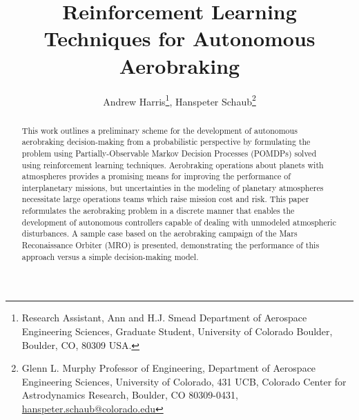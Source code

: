 \documentclass[paper,11pt]{AAS}		%
\begin{document}
\title{Reinforcement Learning Techniques for Autonomous Aerobraking}

\author{Andrew Harris\thanks{Research Assistant, Ann and H.J. Smead Department of Aerospace Engineering Sciences, Graduate 
Student, University of Colorado Boulder, Boulder,
		CO, 80309 USA.},
		Hanspeter Schaub\thanks{Glenn L. Murphy Professor of Engineering, Department of Aerospace Engineering Sciences, 
			University of Colorado, 431 UCB, Colorado Center for Astrodynamics Research, Boulder, CO 80309-0431,  
		\href{mailto:hanspeter.schaub@colorado.edu}{hanspeter.schaub@colorado.edu}}
}


\maketitle{} 		


\begin{abstract}
This work outlines a preliminary scheme for the development of autonomous aerobraking decision-making from a probabilistic 
perspective by formulating the problem using Partially-Observable Markov Decision Processes (POMDPs) solved using reinforcement 
learning techniques. Aerobraking operations about planets with atmospheres provides a promising means for 
improving the performance of interplanetary missions, but uncertainties in the modeling of planetary atmospheres necessitate 
large operations teams which raise mission cost and risk. This paper reformulates the aerobraking problem in a discrete manner 
that enables the development of autonomous controllers capable of dealing with unmodeled atmospheric disturbances. A sample 
case based on the aerobraking campaign of the Mars Reconaissance Orbiter (MRO) is presented, demonstrating the performance of 
this approach versus a simple decision-making model. 
\end{abstract}
\end{document}

